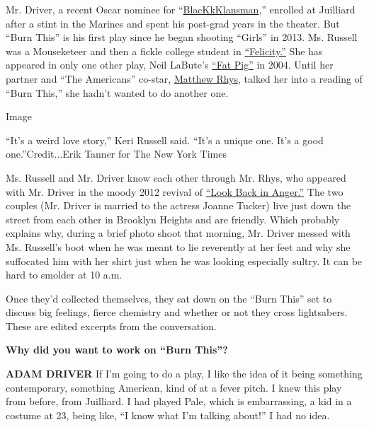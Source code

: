 Mr. Driver, a recent Oscar nominee for
``\href{https://www.nytimes3xbfgragh.onion/2018/08/09/movies/blackkklansman-review-spike-lee.html}{BlacKkKlansman},''
enrolled at Juilliard after a stint in the Marines and spent his
post-grad years in the theater. But ``Burn This'' is his first play
since he began shooting ``Girls'' in 2013. Ms. Russell was a Mouseketeer
and then a fickle college student in
\href{https://abc.go.com/shows/felicity}{``Felicity.''} She has appeared
in only one other play, Neil LaBute's
\href{https://www.nytimes3xbfgragh.onion/2004/12/16/theater/reviews/shes-fat-hes-a-man-can-they-find-love.html}{``Fat
Pig''} in 2004. Until her partner and ``The Americans'' co-star,
\href{https://www.nytimes3xbfgragh.onion/2012/01/22/theater/matthew-rhys-in-look-back-in-anger-on-new-york-stage.html}{Matthew
Rhys}, talked her into a reading of ``Burn This,'' she hadn't wanted to
do another one.

Image

``It's a weird love story,'' Keri Russell said. ``It's a unique one.
It's a good one.''Credit...Erik Tanner for The New York Times

Ms. Russell and Mr. Driver know each other through Mr. Rhys, who
appeared with Mr. Driver in the moody 2012 revival of
\href{https://www.nytimes3xbfgragh.onion/2012/02/03/theater/reviews/look-back-in-anger-starring-matthew-rhys.html}{``Look
Back in Anger.''} The two couples (Mr. Driver is married to the actress
Joanne Tucker) live just down the street from each other in Brooklyn
Heights and are friendly. Which probably explains why, during a brief
photo shoot that morning, Mr. Driver messed with Ms. Russell's boot when
he was meant to lie reverently at her feet and why she suffocated him
with her shirt just when he was looking especially sultry. It can be
hard to smolder at 10 a.m.

Once they'd collected themselves, they sat down on the ``Burn This'' set
to discuss big feelings, fierce chemistry and whether or not they cross
lightsabers. These are edited excerpts from the conversation.

\textbf{Why did you want to work on ``Burn This''?}

\textbf{ADAM DRIVER} If I'm going to do a play, I like the idea of it
being something contemporary, something American, kind of at a fever
pitch. I knew this play from before, from Juilliard. I had played Pale,
which is embarrassing, a kid in a costume at 23, being like, ``I know
what I'm talking about!'' I had no idea.

